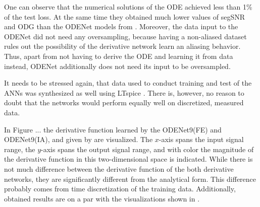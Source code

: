 One can observe that the numerical solutions of the \ac{ODE} achieved less than 1\% of the test loss. At the same time they obtained much lower values of \ac{segSNR} and \ac{ODG} than the ODENet models from . Moreover, the data input to the ODENet did not need any oversampling, because having a non-aliased dataset rules out the possibility of the derivative network learn an aliasing behavior. Thus, apart from not having to derive the \ac{ODE} and learning it from data instead, ODENet additionally does not need its input to be oversampled.

It needs to be stressed again, that data used to conduct training and test of the \acp{ANN} was synthesized as well using LTspice \cite{LTspice}. There is, however, no reason to doubt that the networks would perform equally well on discretized, measured data.

In Figure ... the derivative function learned by the ODENet9(FE) and ODENet9(IA), and given by  are visualized. The $x$-axis spans the input signal range, the $y$-axis spans the output signal range, and with color the magnitude of the derivative function in this two-dimensional space is indicated. While there is not much difference between the derivative function of the both derivative networks, they are significantly different from the analytical form. This difference probably comes from time discretization of the training data. Additionally, obtained results are on a par with the visualizations shown in \cite{Parker2019}.

